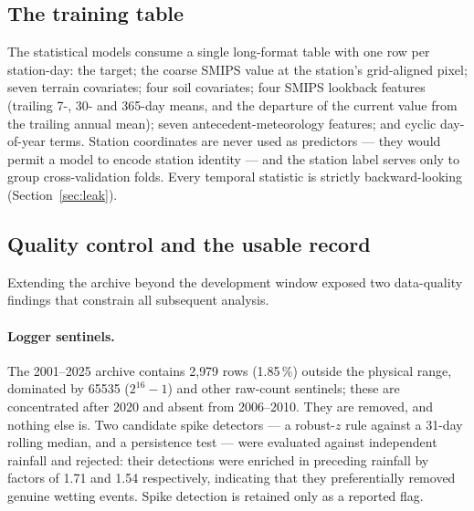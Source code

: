 \documentclass[11pt,a4paper]{article}
\begin{document}
\subsection{The training table}\label{sec:table}

The statistical models consume a single long-format table with one row per
station-day: the target; the coarse SMIPS value at the station's grid-aligned
pixel; seven terrain covariates; four soil covariates; four SMIPS lookback
features (trailing 7-, 30- and 365-day means, and the departure of the current
value from the trailing annual mean); seven antecedent-meteorology features;
and cyclic day-of-year terms. Station coordinates are never used as predictors
--- they would permit a model to encode station identity --- and the station
label serves only to group cross-validation folds. Every temporal statistic is
strictly backward-looking (Section~\ref{sec:leak}).

\subsection{Quality control and the usable record}\label{sec:qc}

Extending the archive beyond the development window exposed two data-quality
findings that constrain all subsequent analysis.

\paragraph{Logger sentinels.} The 2001--2025 archive contains 2{,}979 rows
(1.85\,\%) outside the physical range, dominated by 65535 ($2^{16}-1$) and
other raw-count sentinels; these are concentrated after 2020 and absent from
2006--2010. They are removed, and nothing else is. Two candidate spike
detectors --- a robust-$z$ rule against a 31-day rolling median, and a
persistence test --- were evaluated against independent rainfall and rejected:
their detections were enriched in preceding rainfall by factors of 1.71 and
1.54 respectively, indicating that they preferentially removed genuine wetting
events. Spike detection is retained only as a reported flag.
\end{document}
